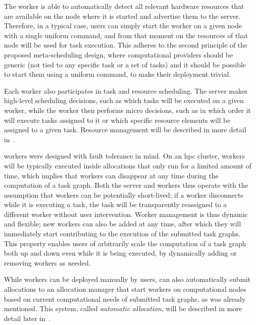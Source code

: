 The worker is able to automatically detect all relevant hardware resources that are available on
the node where it is started and advertise them to the server. Therefore, in a typical case, users
can simply start the worker on a given node with a single uniform command, and from that moment on
the resources of that node will be used for task execution. This adheres to the second principle of
the proposed meta-scheduling design, where computational providers should be generic (not tied to
any specific task or a set of tasks) and it should be possible to start them using a uniform
command, to make their deployment trivial.

Each worker also participates in task and resource scheduling. The server makes high-level
scheduling decisions, such as which tasks will be executed on a given worker, while the worker then
performs micro decisions, such as in which order it will execute tasks assigned to it or which
specific resource elements will be assigned to a given task. Resource management will be described
in more detail in~.

\hyperqueue{} workers were designed with fault tolerance in mind. On an
\gls{hpc}
cluster, workers will be typically executed inside allocations that only run for a limited amount
of time, which implies that workers can disappear at any time during the computation of a task
graph. Both the server and workers thus operate with the assumption that workers can be potentially
short-lived; if a worker disconnects while it is executing a task, the task will be transparently
reassigned to a different worker without user intervention. Worker management is thus dynamic and
flexible; new workers can also be added at any time, after which they will immediately start
contributing to the execution of the submitted task graphs. This property enables users of
arbitrarily scale the computation of a task graph both up and down even while it is being executed,
by dynamically adding or removing workers as needed.

While workers can be deployed manually by users, \hq{} can also automatically
submit allocations to an allocation manager that start workers on computational nodes based on
current computational needs of submitted task graphs, as was already mentioned. This system, called
\emph{automatic allocation}, will be described in more detail later in~.

